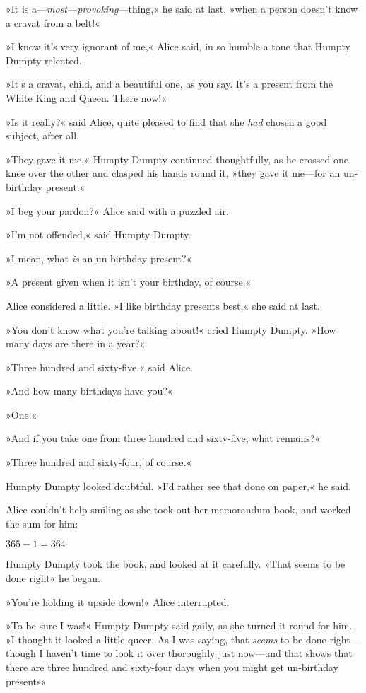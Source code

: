 »It is a—\textit{most—provoking}—thing,« he said at last, »when a person doesn't know a cravat from a belt!«

»I know it's very ignorant of me,« Alice said, in so humble a tone that Humpty Dumpty relented.

»It's a cravat, child, and a beautiful one, as you say. It's a present from the White King and Queen. There now!«

»Is it really?« said Alice, quite pleased to find that she \textit{had} chosen a good subject, after all.

»They gave it me,« Humpty Dumpty continued thoughtfully, as he crossed one knee over the other and clasped his hands round it, »they gave it me—for an un-birthday present.«

»I beg your pardon?« Alice said with a puzzled air.

»I'm not offended,« said Humpty Dumpty.

»I mean, what \textit{is} an un-birthday present?«

»A present given when it isn't your birthday, of course.«

Alice considered a little. »I like birthday presents best,« she said at last.

»You don't know what you're talking about!« cried Humpty Dumpty. »How many days are there in a year?«

»Three hundred and sixty-five,« said Alice.

»And how many birthdays have you?«

»One.«

»And if you take one from three hundred and sixty-five, what remains?«

»Three hundred and sixty-four, of course.«

Humpty Dumpty looked doubtful. »I'd rather see that done on paper,« he said.

Alice couldn't help smiling as she took out her memorandum-book, and worked the sum for him:

$365 - 1 = 364$


Humpty Dumpty took the book, and looked at it carefully. »That seems to be done right\longdash« he began.

»You're holding it upside down!« Alice interrupted.

»To be sure I was!« Humpty Dumpty said gaily, as she turned it round for him. »I thought it looked a little queer. As I was saying, that \textit{seems} to be done right—though I haven't time to look it over thoroughly just now—and that shows that there are three hundred and sixty-four days when you might get un-birthday presents\longdash«

